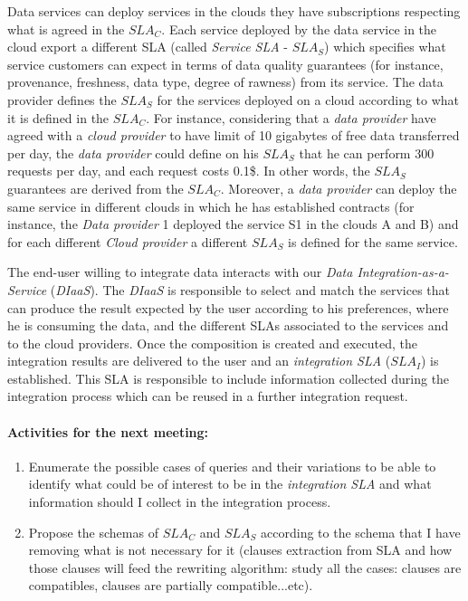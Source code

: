 \documentclass[12pt,a4paper,oneside]{article}
\begin{document}
Data services can deploy services in the clouds they have subscriptions respecting what is agreed in the $SLA_{C}$. Each service deployed by the data service in the cloud export a different SLA (called \textsl{Service SLA} - $SLA_{S}$) which specifies what service customers can expect in terms of data quality guarantees (for instance, provenance, freshness, data type, degree of rawness) from its service. The data provider defines the $SLA_{S}$ for the services deployed on a cloud according to what it is defined in the $SLA_{C}$. For instance, considering that a \textsl{data provider} have agreed with a \textsl{cloud provider} to have limit of 10 gigabytes of free data transferred per day, the \textsl{data provider} could define on his $SLA_{S}$ that he can perform 300 requests per day, and each request costs 0.1\$. In other words, the $SLA_{S}$ guarantees are derived from the $SLA_{C}$. Moreover, a \textsl{data provider} can deploy the same service in different clouds in which he has established contracts (for instance, the \textsl{Data provider} 1 deployed the service S1 in the clouds A and B) and for each different \textsl{Cloud provider} a different $SLA_{S}$ is defined for the same service.

The end-user willing to integrate data interacts with our \textsl{Data Integration-as-a-Service} (\textsl{DIaaS}). The \textsl{DIaaS} is responsible to select and match the services that can produce the result expected by the user according to his preferences, where he is consuming the data, and the different SLAs associated to the services and to the cloud providers. Once the composition is created and executed, the integration results are delivered to the user and an \textsl{integration SLA} ($SLA_{I}$) is established. This SLA is responsible to include information collected during the integration process which can be reused in a further integration request.

\paragraph{Activities for the next meeting:}
\begin{enumerate}
\item Enumerate the possible cases of queries and their variations to be able to identify what could be of interest to be in the \textsl{integration SLA} and what information should I collect in the integration process.
\item Propose the schemas of $SLA_{C}$ and $SLA_{S}$ according to the schema that I have removing what is not necessary for it (clauses extraction from SLA and how those clauses will feed the rewriting algorithm: study all the cases: clauses are compatibles, clauses are partially compatible...etc).
\end{enumerate}
\end{document}
